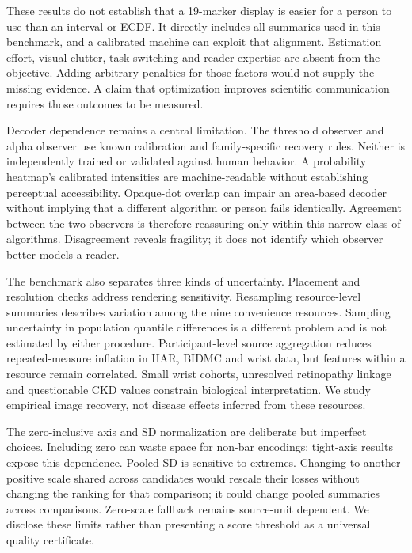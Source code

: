 \documentclass[11pt]{article}
\begin{document}
These results do not establish that a 19-marker display is easier for a person to use than an interval or ECDF. It directly includes all summaries used in this benchmark, and a calibrated machine can exploit that alignment. Estimation effort, visual clutter, task switching and reader expertise are absent from the objective. Adding arbitrary penalties for those factors would not supply the missing evidence. A claim that optimization improves scientific communication requires those outcomes to be measured.

Decoder dependence remains a central limitation. The threshold observer and alpha observer use known calibration and family-specific recovery rules. Neither is independently trained or validated against human behavior. A probability heatmap's calibrated intensities are machine-readable without establishing perceptual accessibility.\cite{crameri2020} Opaque-dot overlap can impair an area-based decoder without implying that a different algorithm or person fails identically. Agreement between the two observers is therefore reassuring only within this narrow class of algorithms. Disagreement reveals fragility; it does not identify which observer better models a reader.

The benchmark also separates three kinds of uncertainty. Placement and resolution checks address rendering sensitivity. Resampling resource-level summaries describes variation among the nine convenience resources. Sampling uncertainty in population quantile differences is a different problem and is not estimated by either procedure. Participant-level source aggregation reduces repeated-measure inflation in HAR, BIDMC and wrist data, but features within a resource remain correlated. Small wrist cohorts, unresolved retinopathy linkage and questionable CKD values constrain biological interpretation. We study empirical image recovery, not disease effects inferred from these resources.

The zero-inclusive axis and SD normalization are deliberate but imperfect choices. Including zero can waste space for non-bar encodings; tight-axis results expose this dependence. Pooled SD is sensitive to extremes. Changing to another positive scale shared across candidates would rescale their losses without changing the ranking for that comparison; it could change pooled summaries across comparisons. Zero-scale fallback remains source-unit dependent. We disclose these limits rather than presenting a score threshold as a universal quality certificate.
\end{document}
